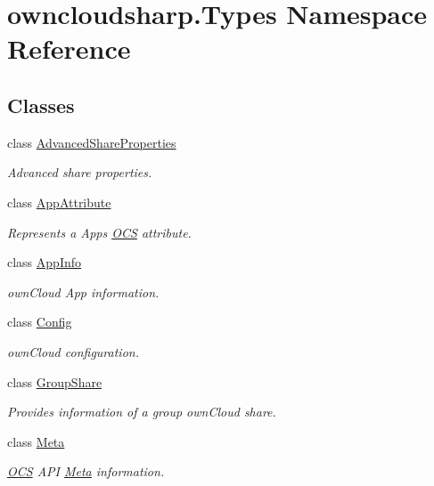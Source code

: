 \hypertarget{namespaceowncloudsharp_1_1_types}{}\section{owncloudsharp.\+Types Namespace Reference}
\label{namespaceowncloudsharp_1_1_types}
\subsection*{Classes}
\begin{DoxyCompactItemize}
\item 
class \hyperlink{classowncloudsharp_1_1_types_1_1_advanced_share_properties}{Advanced\+Share\+Properties}
\begin{DoxyCompactList}\small\item\em Advanced share properties. \end{DoxyCompactList}\item 
class \hyperlink{classowncloudsharp_1_1_types_1_1_app_attribute}{App\+Attribute}
\begin{DoxyCompactList}\small\item\em Represents a Apps \hyperlink{classowncloudsharp_1_1_types_1_1_o_c_s}{O\+CS} attribute. \end{DoxyCompactList}\item 
class \hyperlink{classowncloudsharp_1_1_types_1_1_app_info}{App\+Info}
\begin{DoxyCompactList}\small\item\em own\+Cloud App information. \end{DoxyCompactList}\item 
class \hyperlink{classowncloudsharp_1_1_types_1_1_config}{Config}
\begin{DoxyCompactList}\small\item\em own\+Cloud configuration. \end{DoxyCompactList}\item 
class \hyperlink{classowncloudsharp_1_1_types_1_1_group_share}{Group\+Share}
\begin{DoxyCompactList}\small\item\em Provides information of a group own\+Cloud share. \end{DoxyCompactList}\item 
class \hyperlink{classowncloudsharp_1_1_types_1_1_meta}{Meta}
\begin{DoxyCompactList}\small\item\em \hyperlink{classowncloudsharp_1_1_types_1_1_o_c_s}{O\+CS} A\+PI \hyperlink{classowncloudsharp_1_1_types_1_1_meta}{Meta} information. \end{DoxyCompactList}\item 

\end{DoxyCompactItemize}
